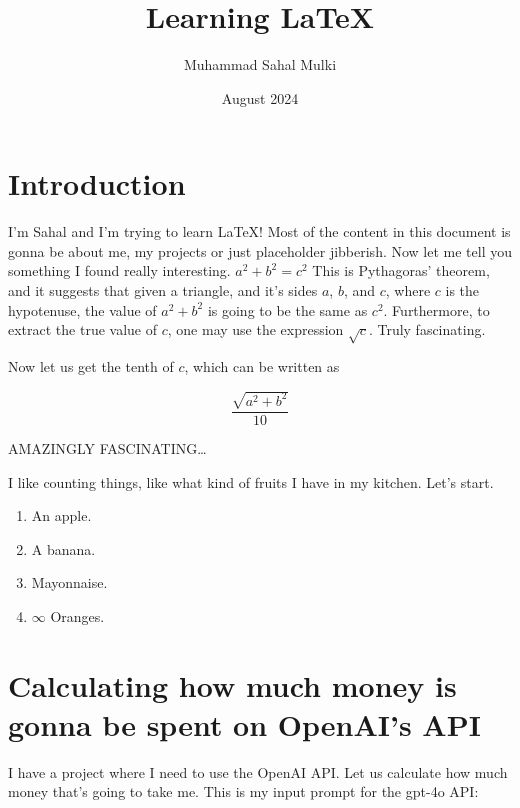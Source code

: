 \documentclass{article}
\title{Learning LaTeX}
\author{Muhammad Sahal Mulki}
\date{August 2024}
\begin{document}
\maketitle

\section{Introduction}

I'm Sahal and I'm trying to learn \LaTeX! Most of the content in this document is gonna be about me, my projects or just placeholder jibberish. Now let me tell you something I found really interesting. $a^2 + b^2 = c^2$ This is Pythagoras' theorem, and it suggests that given a triangle, and it's sides $a$, $b$, and $c$, where $c$ is the hypotenuse, the value of $a^2 + b^2$ is going to be the same as $c^2$. Furthermore, to extract the true value of $c$, one may use the expression $\sqrt{c}$. Truly fascinating.

\bigskip

Now let us get the tenth of $c$, which can be written as

$$\frac{\sqrt{a^2 + b^2}}{10}$$

\bigskip

AMAZINGLY FASCINATING\dots

\bigskip

I like counting things, like what kind of fruits I have in my kitchen. Let's start.

\begin{enumerate}
    \item An apple.
    
    \item A banana.

    \item Mayonnaise.

    \item $\infty$ Oranges.
    
\end{enumerate}

\lipsum[1]

\section{Calculating how much money is gonna be spent on OpenAI's API}

I have a project where I need to use the OpenAI API. Let us calculate how much money that's going to take me. This is my input prompt for the gpt-4o API:
\end{document}
